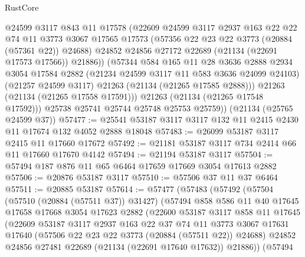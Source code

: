 \begin{lexlean}{RustCore}
\begin{coremodule}
              @24599
              @3117
              @843
              @11
              @17578
              (@22609
                @24599
                @3117
                @2937
                @163
                @22
                @22
                @74
                @11
                @3773
                @3067
                @17565
                @17573
                (@57356 @22 @23 @22 @3773 (@20884 (@57361 @22)) @24688)
                @24852
                @24856
                @27172
                @22689
                (@21134 (@22691 @17573 @17566))
                @21886))
            (@57344
              @584
              @165
              @11
              @28
              @3636
              @2888
              @2934
              @3054
              @17584
              @2882
              (@21234 @24599 @3117 @11 @583 @3636 @24099 @24103)
              (@21257 @24599 @3117)
              @21263
              (@21134 (@21265 @17585 @2888)))
            @21263
            (@21134 (@21265 @17558 @17591)))
          @21263
          (@21134 (@21265 @17548 @17592)))
        @25738
        @25741
        @25744
        @25748
        @25753
        @25759))
    (@21134 (@25765 @24599 @37))
@57477 := @25541 @53187 @3117 @3117 @132 @11 @2415 @2430 @11 @17674 @132 @4052 @2888 @18048
@57483 := @26099 @53187 @3117 @2415 @11 @17660 @17672
@57492 := @21181 @53187 @3117 @734 @2414 @66 @11 @17660 @17670 @4142
@57494 := @21194 @53187 @3117
@57504 := @57494 @187 @876 @11 @65 @6464 @17659 @17669 @3054 @17613 @2882
@57506 := @20876 @53187 @3117
@57510 := @57506 @37 @11 @37 @6464
@57511 := @20885 @53187
@57614 := @57477
    (@57483
      (@57492
        (@57504
          (@57510 (@20884 (@57511 @37)) @31427)
          (@57494
            @858
            @586
            @11
            @40
            @17645
            @17658
            @17668
            @3054
            @17623
            @2882
            (@22600
              @53187
              @3117
              @858
              @11
              @17645
              (@22609
                @53187
                @3117
                @2937
                @163
                @22
                @37
                @74
                @11
                @3773
                @3067
                @17631
                @17640
                (@57506 @22 @23 @22 @3773 (@20884 (@57511 @22)) @24688)
                @24852
                @24856
                @27481
                @22689
                (@21134 (@22691 @17640 @17632))
                @21886))
            (@57494

\end{coremodule}
\end{lexlean}

